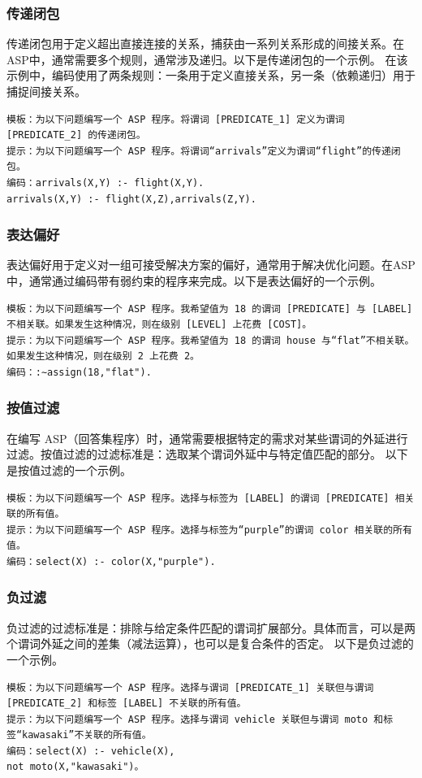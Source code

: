 \subsubsection{传递闭包}
传递闭包用于定义超出直接连接的关系，捕获由一系列关系形成的间接关系。在ASP中，通常需要多个规则，通常涉及递归。以下是传递闭包的一个示例。
在该示例中，编码使用了两条规则：一条用于定义直接关系，另一条（依赖递归）用于捕捉间接关系。
\begin{lstlisting}
模板：为以下问题编写一个 ASP 程序。将谓词 [PREDICATE_1] 定义为谓词 [PREDICATE_2] 的传递闭包。
提示：为以下问题编写一个 ASP 程序。将谓词“arrivals”定义为谓词“flight”的传递闭包。
编码：arrivals(X,Y) :- flight(X,Y).
arrivals(X,Y) :- flight(X,Z),arrivals(Z,Y).
\end{lstlisting}
\subsubsection{表达偏好}
表达偏好用于定义对一组可接受解决方案的偏好，通常用于解决优化问题。在ASP中，通常通过编码带有弱约束的程序来完成。以下是表达偏好的一个示例。
\begin{lstlisting}
模板：为以下问题编写一个 ASP 程序。我希望值为 18 的谓词 [PREDICATE] 与 [LABEL] 不相关联。如果发生这种情况，则在级别 [LEVEL] 上花费 [COST]。
提示：为以下问题编写一个 ASP 程序。我希望值为 18 的谓词 house 与“flat”不相关联。如果发生这种情况，则在级别 2 上花费 2。
编码：:∼assign(18,"flat").
\end{lstlisting}
\subsubsection{按值过滤}
在编写 ASP（回答集程序）时，通常需要根据特定的需求对某些谓词的外延进行过滤。按值过滤的过滤标准是：选取某个谓词外延中与特定值匹配的部分。
以下是按值过滤的一个示例。
\begin{lstlisting}
模板：为以下问题编写一个 ASP 程序。选择与标签为 [LABEL] 的谓词 [PREDICATE] 相关联的所有值。
提示：为以下问题编写一个 ASP 程序。选择与标签为“purple”的谓词 color 相关联的所有值。
编码：select(X) :- color(X,"purple").
\end{lstlisting}
\subsubsection{负过滤}
负过滤的过滤标准是：排除与给定条件匹配的谓词扩展部分。具体而言，可以是两个谓词外延之间的差集（减法运算），也可以是复合条件的否定。
以下是负过滤的一个示例。
\begin{lstlisting}
模板：为以下问题编写一个 ASP 程序。选择与谓词 [PREDICATE_1] 关联但与谓词 [PREDICATE_2] 和标签 [LABEL] 不关联的所有值。
提示：为以下问题编写一个 ASP 程序。选择与谓词 vehicle 关联但与谓词 moto 和标签“kawasaki”不关联的所有值。
编码：select(X) :- vehicle(X),
not moto(X,"kawasaki")。
\end{lstlisting}
